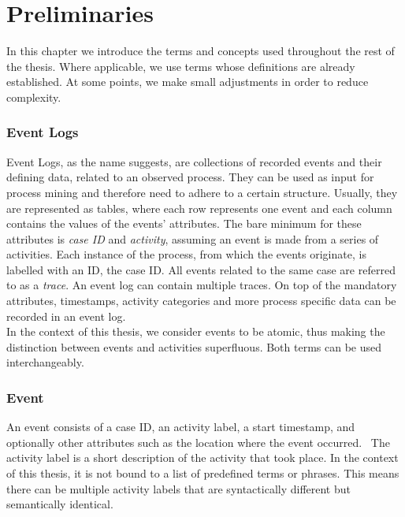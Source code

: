 
\section{Preliminaries}\label{sec:back}
In this chapter we introduce the terms and concepts used throughout the rest of the thesis. Where applicable, we use terms whose definitions are already established. At some points, we make small adjustments in order to reduce complexity. 
\subsubsection*{Event Logs}\label{sec:event-log}
Event Logs, as the name suggests, are collections of recorded events and their defining data, related to an observed process. They can be used as input for process mining and therefore need to adhere to a certain structure. Usually, they are represented as tables, where each row represents one event and each column contains the values of the events' attributes. The bare minimum for these attributes is \emph{case ID} and \emph{activity}, assuming an event is made from a series of activities. Each instance of the process, from which the events originate, is labelled with an ID, the case ID. All events related to the same case are referred to as a \emph{trace}. An event log can contain multiple traces. On top of the mandatory attributes, timestamps, activity categories and more process specific data can be recorded in an event log.~\cite{van_der_aalst_process_2016}\\
In the context of this thesis, we consider events to be atomic, thus making the distinction between events and activities superfluous. Both terms can be used interchangeably.

\subsubsection*{Event}\label{sec:event}
An event consists of a case ID, an activity label, a start timestamp, and optionally other attributes such as the location where the event occurred.~\cite{van_der_aalst_process_2016} The activity label is a short description of the activity that took place. In the context of this thesis, it is not bound to a list of predefined terms or phrases. This means there can be multiple activity labels that are syntactically different but semantically identical.

